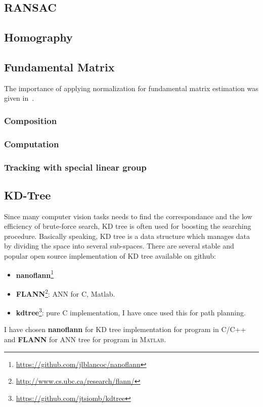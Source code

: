 \subsection{RANSAC}

\subsection{Homography}

\subsection{Fundamental Matrix}
The importance of applying normalization for fundamental matrix estimation was given in~\cite{hartley1995defence}.

\subsubsection{Composition}
\subsubsection{Computation}
\subsubsection{Tracking with special linear group}

\subsection{KD-Tree}
Since many computer vision tasks needs to find the correspondance and the low efficiency of brute-force search, KD tree is often used for boosting the searching procedure. Basically speaking, KD tree is a data structure which manages data by dividing the space into several sub-spaces. There are several stable and popular open source implementation of KD tree available on github:
\begin{itemize}
\item \textbf{nanoflann}\footnote{\url{https://github.com/jlblancoc/nanoflann}}
\item \textbf{FLANN}\footnote{\url{http://www.cs.ubc.ca/research/flann/}}: ANN for C, Matlab.
\item \textbf{kdtree}\footnote{\url{https://github.com/jtsiomb/kdtree}}: pure C implementation, I have once used this for path planning.
\end{itemize}
I have chosen \textbf{nanoflann} for KD tree implementation for program in \textsc{C/C++} and \textbf{FLANN} for ANN tree for program in \textsc{Matlab}.

